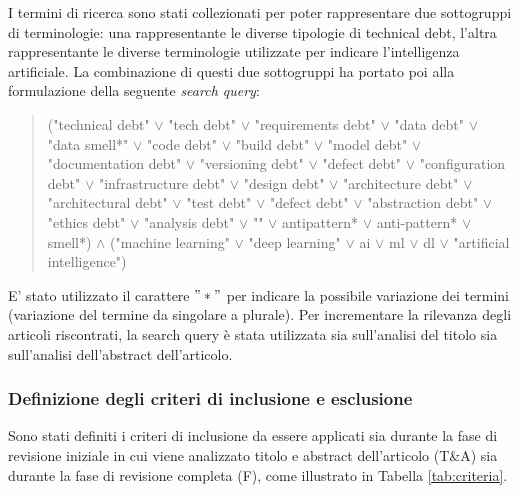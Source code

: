 I termini di ricerca sono stati collezionati per poter rappresentare due sottogruppi di terminologie: una rappresentante le diverse tipologie di technical debt, l'altra rappresentante le diverse terminologie utilizzate per indicare l'intelligenza artificiale. La combinazione di questi due sottogruppi ha portato poi alla formulazione della seguente \textit{search query}:
\begin{quote}
   ("technical debt" $\vee$ "tech debt" $\vee$ "requirements debt" $\vee$ "data debt" $\vee$ "data smell*" $\vee$ "code debt" $\vee$ "build debt" $\vee$ "model debt" $\vee$ "documentation debt" $\vee$ "versioning debt" $\vee$ "defect debt" $\vee$ "configuration debt" $\vee$ "infrastructure debt" $\vee$ "design debt" $\vee$ "architecture debt" $\vee$ "architectural debt" $\vee$ "test debt" $\vee$ "defect debt" $\vee$ "abstraction debt" $\vee$ "ethics debt" $\vee$ "analysis debt" $\vee$ "" $\vee$ antipattern* $\vee$ anti-pattern* $\vee$ smell*) $\wedge$ ("machine learning" $\vee$ "deep learning" $\vee$ ai $\vee$ ml $\vee$ dl $\vee$ "artificial intelligence")
\end{quote}
E' stato utilizzato il carattere $"*"$ per indicare la possibile variazione dei termini (\eg variazione del termine da singolare a plurale).
Per incrementare la rilevanza degli articoli riscontrati, la search query è stata utilizzata sia sull'analisi del titolo sia sull'analisi dell'abstract dell'articolo.

\subsubsection{Definizione degli criteri di inclusione e esclusione}
Sono stati definiti i criteri di inclusione da essere applicati sia durante la fase di revisione iniziale in cui viene analizzato titolo e abstract dell'articolo (T\&A) sia durante la fase di revisione completa (F), come illustrato in Tabella \ref{tab:criteria}.

